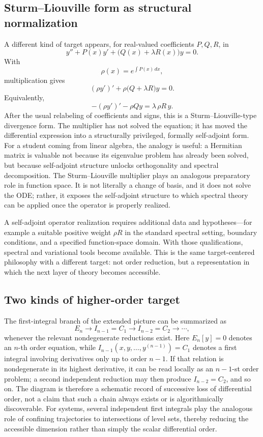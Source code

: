 \documentclass[11pt]{article}
\theoremstyle{definition}
\begin{document}
\subsection*{Sturm--Liouville form as structural normalization}
A different kind of target appears, for real-valued coefficients \(P,Q,R\), in
\[
y''+P(x)y'+\bigl(Q(x)+\lambda R(x)\bigr)y=0.
\]
With
\[
\rho(x)=e^{\int P(x)\,dx},
\]
multiplication gives
\[
(\rho y')'+\rho\bigl(Q+\lambda R\bigr)y=0.
\]
Equivalently,
\[
-(\rho y')'-\rho Qy=\lambda\,\rho R\,y.
\]
After the usual relabeling of coefficients and signs, this is a Sturm--Liouville-type divergence form. The multiplier has not solved the equation; it has moved the differential expression into a structurally privileged, formally self-adjoint form. For a student coming from linear algebra, the analogy is useful: a Hermitian matrix is valuable not because its eigenvalue problem has already been solved, but because self-adjoint structure unlocks orthogonality and spectral decomposition. The Sturm--Liouville multiplier plays an analogous preparatory role in function space. It is not literally a change of basis, and it does not solve the ODE; rather, it exposes the self-adjoint structure to which spectral theory can be applied once the operator is properly realized.

A self-adjoint operator realization requires additional data and hypotheses---for example a suitable positive weight \(\rho R\) in the standard spectral setting, boundary conditions, and a specified function-space domain. With those qualifications, spectral and variational tools become available. This is the same target-centered philosophy with a different target: not order reduction, but a representation in which the next layer of theory becomes accessible.

\subsection*{Two kinds of higher-order target}
The first-integral branch of the extended picture can be summarized as
\[
E_n
\longrightarrow
I_{n-1}=C_1
\longrightarrow
I_{n-2}=C_2
\longrightarrow\cdots,
\]
whenever the relevant nondegenerate reductions exist. Here \(E_n[y]=0\) denotes an \(n\)-th order equation, while \(I_{n-1}(x,y,\ldots,y^{(n-1)})=C_1\) denotes a first integral involving derivatives only up to order \(n-1\). If that relation is nondegenerate in its highest derivative, it can be read locally as an \(n-1\)-st order problem; a second independent reduction may then produce \(I_{n-2}=C_2\), and so on. The diagram is therefore a schematic record of successive loss of differential order, not a claim that such a chain always exists or is algorithmically discoverable. For systems, several independent first integrals play the analogous role of confining trajectories to intersections of level sets, thereby reducing the accessible dimension rather than simply the scalar differential order.
\end{document}
